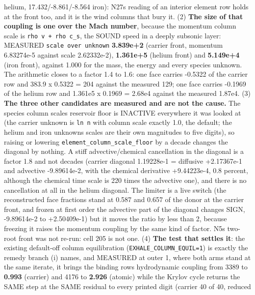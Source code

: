 \documentclass[english,a4paper]{my_memo}
\begin{document}
\begin{itemize}
  helium, 17.432/-8.861/-8.564 iron): N27\textquotesingle s reading of an interior element
  row holds at the front too, and it is the wind columns that bury it. (2)
  \textbf{The size of that coupling is one over the Mach number}, because the
  momentum column scale is \texttt{\textbar{}rho\ v\textbar{}\ +\ rho\ c\_s}, the SOUND speed in a deeply
  subsonic layer: MEASURED \texttt{scale\ over\ unknown} \textbf{3.839e+2} (carrier front,
  momentum 6.83274e-5 against scale 2.62332e-2), \textbf{1.361e+5} (helium front)
  and \textbf{5.149e+4} (iron front), against 1.000 for the mass, the energy and
  every species unknown. The arithmetic closes to a factor 1.4 to 1.6: one
  face carries -0.5322 of the carrier row and 383.9 x 0.5322 = 204 against
  the measured 129; one face carries -0.1969 of the helium row and
  1.361e5 x 0.1969 = 2.68e4 against the measured 1.87e4. (3) \textbf{The three
  other candidates are measured and are not the cause.} The species column
  scale\textquotesingle s reservoir floor is INACTIVE everywhere it was looked at (the
  carrier unknown is \texttt{ln\ n} with column scale exactly 1.0, the default; the
  helium and iron unknowns\textquotesingle{} scales are their own magnitudes to five digits),
  so raising or lowering \texttt{element\_column\_scale\_floor} by a decade changes the
  diagonal by nothing. A stiff advective/chemical cancellation in the
  diagonal is a factor 1.8 and not decades (carrier diagonal 1.19228e-1 =
  diffusive +2.17367e-1 and advective -9.89614e-2, with the chemical
  derivative +9.44223e-4, 0.8 percent, although the chemical time scale is
  220 times the advective one), and there is no cancellation at all in the
  helium diagonal. The limiter is a live switch (the reconstructed face
  fractions stand at 0.587 and 0.657 of the donor at the carrier front, and
  frozen at first order the advective part of the diagonal changes SIGN,
  -9.89614e-2 to +2.50409e-1) but it moves the ratio by less than 2, because
  freezing it raises the momentum coupling by the same kind of factor. N5\textquotesingle s
  two-root front was not re-run: cell 205 is not one. (4) \textbf{The test that
  settles it}: the existing default-off column equilibration
  (\texttt{EXHALE\_COLUMN\_EQUIL=1}) is exactly the remedy branch (i) names, and
  MEASURED at outer 1, where both arms stand at the same iterate, it brings
  the binding row\textquotesingle s hydrodynamic coupling from 3389 to \textbf{0.993} (carrier)
  and 4176 to \textbf{2.926} (atomic) while the Krylov cycle returns the SAME step
  at the SAME residual to every printed digit (carrier 40 of 40, reduced

\end{itemize}
\end{document}
